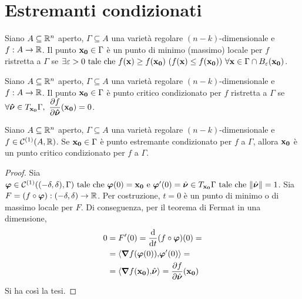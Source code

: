 \section{Estremanti condizionati}

\begin{definition}
    Siano $A\subseteq\mathbb{R}^n$ aperto, $\Gamma \subseteq A$ una varietà regolare $(n-k)$-dimensionale e $f: A\to\mathbb{R}$. Il punto $\vb{x_0} \in \Gamma$ è un punto di minimo (massimo) locale per $f$ ristretta a $\Gamma$ se $\exists \varepsilon > 0 \text{ tale che } f(\vb{x}) \geq f(\vb{x_0}) \ (f(\vb{x}) \leq f(\vb{x_0})) \ \forall \vb{x} \in \Gamma \cap B_\varepsilon(\vb{x_0})$.
\end{definition}

\begin{definition}
    Siano $A\subseteq\mathbb{R}^n$ aperto, $\Gamma \subseteq A$ una varietà regolare $(n-k)$-dimensionale e $f: A\to\mathbb{R}$. Il punto $\vb{x_0} \in \Gamma$ è punto critico condizionato per $f$ ristretta a $\Gamma$ se $\forall \bm{\hat{\nu}} \in T_{\vb{x_0}}\Gamma, \ \displaystyle\frac{\partial f}{\partial \bm{\hat{\nu}}}(\vb{x_0})=0$. 
\end{definition}

\begin{theorem}
    \label{thm:fermat_cond}
    Siano $A\subseteq\mathbb{R}^n$ aperto, $\Gamma \subseteq A$ una varietà regolare $(n-k)$-dimensionale e $f\in\mathcal{C}^{(1)}(A,\mathbb{R})$. Se $\vb{x_0} \in \Gamma$ è punto estremante condizionato per $f$ a $\Gamma$, allora $\vb{x_0}$ è un punto critico condizionato per $f$ a $\Gamma$.
\end{theorem}

\begin{proof}
    Sia $\bm\varphi\in \mathcal{C}^{(1)}((-\delta,\delta),\Gamma) \text{ tale che } \bm\varphi(0)=\vb{x_0} \text{ e } \bm\varphi'(0)=\hat{\bm\nu}\in T_{\vb{x_0}}\Gamma \text{ tale che } \norm{\hat{\bm\nu}}=1$.
    Sia $F=(f\circ\bm\varphi):(-\delta,\delta)\to\mathbb{R}$. Per costruzione, $t=0$ è un punto di minimo o di massimo locale per $F$.
    Di conseguenza, per il teorema di Fermat in una dimensione,
    \begin{align*}
        0&=F'(0)=\frac{\dd }{\dd t}(f\circ\bm\varphi)(0)=\\
        &=\left\langle\grad f(\bm\varphi(0)){,}\bm\varphi'(0)\right\rangle=\\
        &=\left\langle\grad f(\vb{x_0}){,}\hat{\bm\nu}\right\rangle=\frac{\partial f}{\partial \hat{\bm\nu}}(\vb{x_0})
    \end{align*}
    Si ha così la tesi.
\end{proof}

